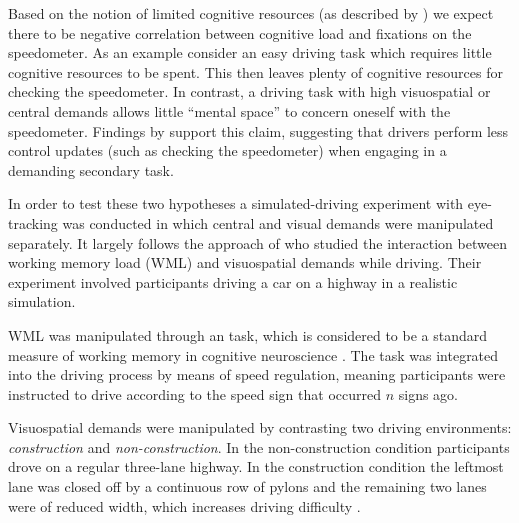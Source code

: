 Based on the notion of limited cognitive resources (as described by \citet{DeWaard1996}) we expect there to be negative correlation between cognitive load and fixations on the speedometer.
As an example consider an easy driving task which requires little cognitive resources to be spent.
This then leaves plenty of cognitive resources for checking the speedometer.
In contrast, a driving task with high visuospatial or central demands allows little ``mental space'' to concern oneself with the speedometer.
Findings by \citet{Salvucci2011} support this claim, suggesting that drivers perform less control updates (such as checking the speedometer) when engaging in a demanding secondary task.

In order to test these two hypotheses a simulated-driving experiment with eye-tracking was conducted in which central and visual demands were manipulated separately.
It largely follows the approach of \citet{Scheunemann2019} who studied the interaction between working memory load (WML) and visuospatial demands while driving.
Their experiment involved participants driving a car on a highway in a realistic simulation. 

WML was manipulated through an \nback task, which is considered to be a standard measure of working memory in cognitive neuroscience \citep{Kane2007}.
The task was integrated into the driving process by means of speed regulation, meaning participants were instructed to drive according to the speed sign that occurred \(n\) signs ago.

Visuospatial demands were manipulated by contrasting two driving environments: \textit{construction} and \textit{non-construction}.
In the non-construction condition participants drove on a regular three-lane highway.
In the construction condition the leftmost lane was closed off by a continuous row of pylons and the remaining two lanes were of reduced width, which increases driving difficulty \citep{Liu2016}.